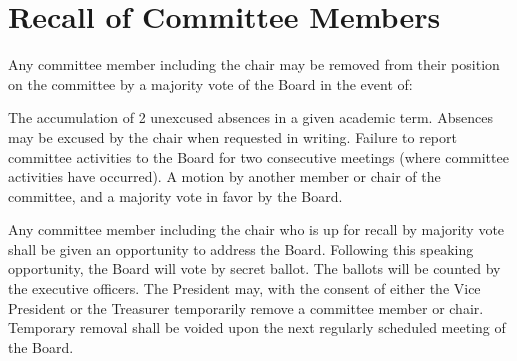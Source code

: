 \section{Recall of Committee Members}
\begin{enumsubsection}
\itemnotoc Any committee member including the chair may be removed from 
their position on the committee by a majority vote of the Board in the 
event of: 
\begin{enumsubsubsection}
\itemnotoc The accumulation of 2 unexcused absences in a given academic 
term. Absences may be excused by the chair when requested in 
writing. 
\itemnotoc Failure to report committee activities to the Board for two 
consecutive meetings (where committee activities have occurred). 
\itemnotoc A motion by another member or chair of the committee, and a 
majority vote in favor by the Board. 
\end{enumsubsubsection}
\itemnotoc Any committee member including the chair who is up for recall by 
majority vote shall be given an opportunity to address the Board. 
Following this speaking opportunity, the Board will vote by secret ballot. 
The ballots will be counted by the executive officers. 
\itemnotoc The President may, with the consent of either the Vice President or
the Treasurer temporarily remove a committee member or chair. 
Temporary removal shall be voided upon the next regularly scheduled 
meeting of the Board. 
\end{enumsubsection}
